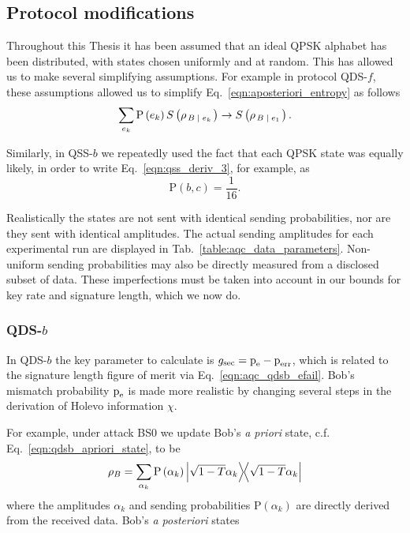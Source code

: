 
\subsection{Protocol modifications}\label{sec:aqc_protocol_modifications}
Throughout this Thesis it has been assumed that an ideal QPSK alphabet has been distributed, with states chosen uniformly and at random. This has allowed us to make several simplifying assumptions. For example in protocol QDS-$f$, these assumptions allowed us to simplify Eq.~\ref{eqn:aposteriori_entropy} as follows
\begin{equation}
\sum_{e_k} \text{P}\left(e_k\right) S\left(\rho_{\left. B \; \middle| \; e_k\right.}\right) \rightarrow S\left(\rho_{\left. B \; \middle| \; e_1\right.}\right).
\end{equation}

\noindent Similarly, in QSS-$b$ we repeatedly used the fact that each QPSK state was equally likely, in order to write Eq.~\ref{eqn:qss_deriv_3}, for example, as
\begin{equation}
\text{P}\left(b, c\right) = \frac{1}{16}.
\end{equation}

\noindent Realistically the states are not sent with identical sending probabilities, nor are they sent with identical amplitudes. The actual sending amplitudes for each experimental run are displayed in Tab.~\ref{table:aqc_data_parameters}. Non-uniform sending probabilities may also be directly measured from a disclosed subset of data. These imperfections must be taken into account in our bounds for key rate and signature length, which we now do.

\subsubsection{QDS-$b$}
In QDS-$b$ the key parameter to calculate is $g_{\text{sec}} = \text{p}_{\text{e}} - \text{p}_{\text{err}}$, which is related to the signature length figure of merit via Eq.~\ref{eqn:aqc_qdsb_efail}. Bob's mismatch probability $\text{p}_{\text{e}}$ is made more realistic by changing several steps in the derivation of Holevo information $\chi$. 

For example, under attack BS$0$ we update Bob's \emph{a priori} state, c.f. Eq.~\ref{eqn:qdsb_apriori_state}, to be
\begin{equation}
\rho_B = \sum_{\alpha_k} \text{P}\left(\alpha_k\right) \dyad{\sqrt{1-T} \alpha_k}
\end{equation}
where the amplitudes $\alpha_k$ and sending probabilities $\text{P}\left(\alpha_k\right)$ are directly derived from the received data. Bob's \emph{a posteriori} states 

